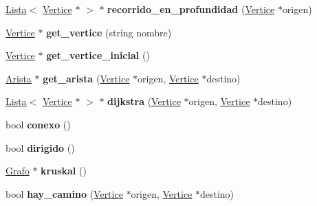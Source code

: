 \begin{DoxyCompactItemize}
\item 
\mbox{\label{classGrafo_ae2773db77afaab3b02a8237b93091818}} 
\hyperlink{classLista}{Lista}$<$ \hyperlink{classVertice}{Vertice} $\ast$ $>$ $\ast$ {\bfseries recorrido\+\_\+en\+\_\+profundidad} (\hyperlink{classVertice}{Vertice} $\ast$origen)
\item 
\mbox{\label{classGrafo_ac088cffbe30ed4c895ac831233251d99}} 
\hyperlink{classVertice}{Vertice} $\ast$ {\bfseries get\+\_\+vertice} (string nombre)
\item 
\mbox{\label{classGrafo_a4baa752c1e6a7e6367672581525c3c19}} 
\hyperlink{classVertice}{Vertice} $\ast$ {\bfseries get\+\_\+vertice\+\_\+inicial} ()
\item 
\mbox{\label{classGrafo_aed632e897451b00634e8f1d8088c12c8}} 
\hyperlink{classArista}{Arista} $\ast$ {\bfseries get\+\_\+arista} (\hyperlink{classVertice}{Vertice} $\ast$origen, \hyperlink{classVertice}{Vertice} $\ast$destino)
\item 
\mbox{\label{classGrafo_a4bb5d2fe50503dd9f6c8042cee3e3631}} 
\hyperlink{classLista}{Lista}$<$ \hyperlink{classVertice}{Vertice} $\ast$ $>$ $\ast$ {\bfseries dijkstra} (\hyperlink{classVertice}{Vertice} $\ast$origen, \hyperlink{classVertice}{Vertice} $\ast$destino)
\item 
\mbox{\label{classGrafo_a50fe04d01b2d34b777d8df0b827bedab}} 
bool {\bfseries conexo} ()
\item 
\mbox{\label{classGrafo_a40fa3c86b1e2890d4dad315bbd59d2d0}} 
bool {\bfseries dirigido} ()
\item 
\mbox{\label{classGrafo_aa2ab9a12d473f6830af554efad5b438d}} 
\hyperlink{classGrafo}{Grafo} $\ast$ {\bfseries kruskal} ()
\item 
\mbox{\label{classGrafo_a24cc1dad8b719978e5fcba8b0950c3f5}} 
bool {\bfseries hay\+\_\+camino} (\hyperlink{classVertice}{Vertice} $\ast$origen, \hyperlink{classVertice}{Vertice} $\ast$destino)
\end{DoxyCompactItemize}
